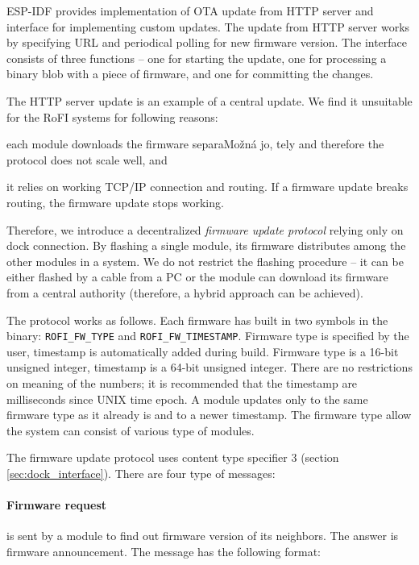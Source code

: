 ESP-IDF provides implementation of OTA update from HTTP server and interface for
implementing custom updates. The update from HTTP server works by specifying URL
and periodical polling for new firmware version. The interface consists of three
functions -- one for starting the update, one for processing a binary blob with
a piece of firmware, and one for committing the changes.

The HTTP server update is an example of a central update. We find it unsuitable
for the RoFI systems for following reasons:
\begin{enumerate*}
    \item each module downloads the firmware separaMožná jo, tely and therefore the
    protocol does not scale well, and
    \item it relies on working TCP/IP connection and routing. If a firmware
    update breaks routing, the firmware update stops working.
\end{enumerate*}
Therefore, we introduce a decentralized \emph{firmware update protocol} relying
only on dock connection. By flashing a single module, its firmware distributes
among the other modules in a system. We do not restrict the flashing procedure
-- it can be either flashed by a cable from a PC or the module can download its
firmware from a central authority (therefore, a hybrid approach can be
achieved).

The protocol works as follows. Each firmware has built in two symbols in the
binary: \texttt{ROFI\_FW\_TYPE} and \texttt{ROFI\_FW\_TIMESTAMP}. Firmware type
is specified by the user, timestamp is automatically added during build.
Firmware type is a 16-bit unsigned integer, timestamp is a 64-bit unsigned
integer. There are no restrictions on meaning of the numbers; it is recommended
that the timestamp are milliseconds since UNIX time epoch. A module updates only
to the same firmware type as it already is and to a newer timestamp. The
firmware type allow the system can consist of various type of modules.

The firmware update protocol uses content type specifier 3 (section
\ref{sec:dock_interface}). There are four type of messages:

\paragraph{Firmware request} is sent by a module to find out firmware version of
its neighbors. The answer is firmware announcement. The message has the
following format:

